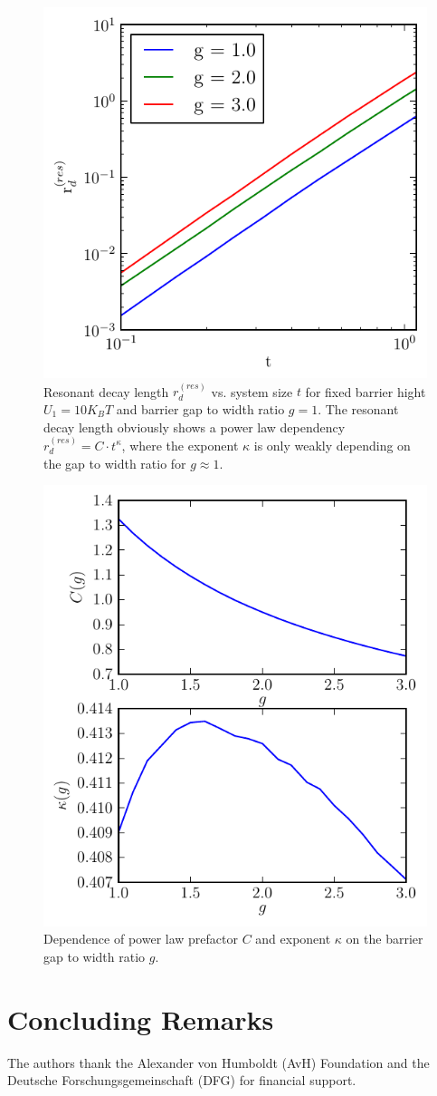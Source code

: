 \documentclass[twocolumn,superscriptaddress]{revtex4}
\begin{document}
\begin{figure}[H]
\includegraphics[width= .5 \textwidth]{plots/resonant_decay_length.pdf}
\caption{Resonant decay length $r_d^{(res)}$ vs. system size $t$ for fixed barrier hight $U_1=10 K_B T$ and barrier gap to width ratio $g=1$. The resonant decay length obviously shows a power law dependency $r_d^{(res)}=C\cdot t^{\kappa}$, where the exponent $\kappa$ is only weakly depending on the gap to width ratio for $g \approx 1$.}
\label{fig5}
\end{figure}

\begin{figure}[H]
\includegraphics[width= .5 \textwidth]{plots/powerlaw_parameters.pdf}
\caption{Dependence of power law prefactor $C$ and exponent $\kappa$ on the barrier gap to width ratio $g$. }
\label{fig6}
\end{figure}



\section{Concluding Remarks}

\acknowledgments
The authors thank the Alexander von Humboldt (AvH) Foundation and the Deutsche Forschungsgemeinschaft (DFG) 
for financial support. 


\end{document}
